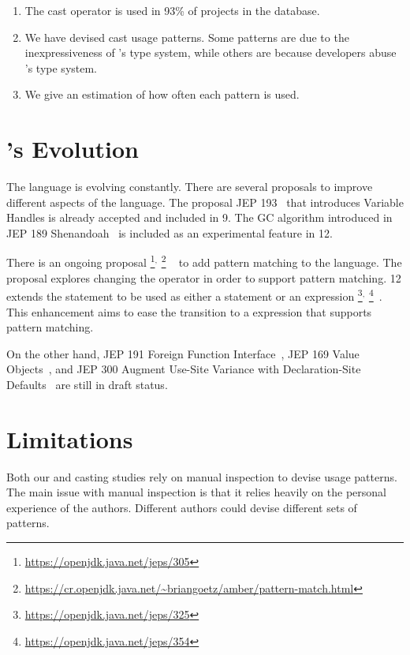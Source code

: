 \begin{enumerate}[label=\ref{casts:rq\arabic*},leftmargin=3.4\parindent]
\item {\bf \crqA} 
The cast operator is used in 93\% of projects in the \lgtm{} database.
\item {\bf \crqB}
We have devised cast usage patterns.
Some patterns are due to the inexpressiveness of \java{}'s type system,
while others are because developers abuse \java{}'s type system.
\item {\bf \crqC} 
We give an estimation of how often each pattern is used.
\end{enumerate}


\section{\java{}'s Evolution}

The \java{} language is evolving constantly.
There are several proposals to improve different aspects of the language.
The proposal JEP 193~\citep{jep193} that introduces Variable Handles is already accepted and included in \java{} 9.
The GC algorithm introduced in JEP 189 Shenandoah~\citep{jep189} is included as an experimental feature in \java{} 12.

There is an ongoing proposal%
\footnote{\url{https://openjdk.java.net/jeps/305}}$^{,}$%
\footnote{\url{https://cr.openjdk.java.net/~briangoetz/amber/pattern-match.html}}%
~\citep{jep305} to add pattern matching to the \java{} language.
The proposal explores changing the  operator in order to support pattern matching.
\java{} 12 extends the  statement to be used as either a statement or an expression%
\footnote{\url{https://openjdk.java.net/jeps/325}}$^{,}$%
\footnote{\url{https://openjdk.java.net/jeps/354}}~\citep{jep325,jep354}.
This enhancement aims to ease the transition to a  expression that supports pattern matching.

On the other hand,
JEP 191 Foreign Function Interface~\citep{jep191},
JEP 169 Value Objects~\citep{jep169}, and
JEP 300 Augment Use-Site Variance with Declaration-Site Defaults~\citep{jep300}
are still in draft status.


\section{Limitations}

Both our \unsafe{} and casting studies rely on manual inspection to devise usage patterns.
The main issue with manual inspection is that it relies heavily on the personal experience of the authors.
Different authors could devise different sets of patterns.

